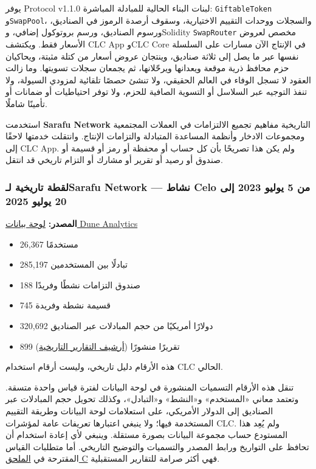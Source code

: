 \documentclass[11pt]{article}
\begin{document}
يوفر Protocol v1.1.0 لبنات البناء الحالية للمبادلة المباشرة: \texttt{GiftableToken} و\texttt{SwapPool}، والسجلات ووحدات التقييم الاختيارية، وسقوف أرصدة الرموز في الصناديق، ورسوم الصناديق، ورسم بروتوكول إضافي، وSolidity \texttt{SwapRouter} مخصص لعروض الأسعار فقط. ويكتشف CLC App وCLC Core في الإنتاج الآن مسارات على السلسلة نفسها عبر ما يصل إلى ثلاثة صناديق، وينتجان عروض أسعار من كتلة مثبتة، ويحاكيان حزم محافظ ذرية موقعة ويعدانها ويرحّلانها، ثم يجمعان سجلات تسويتها. وما زالت العقود لا تسجل الوفاء في العالم الحقيقي، ولا تنشئ حصصًا تلقائية لمزودي السيولة، ولا تنفذ التوجيه عبر السلاسل أو التسوية الصافية للحزم، ولا توفر احتياطيات أو ضمانات أو تأمينًا شاملًا.

استخدمت \textbf{Sarafu Network} التاريخية مفاهيم تجميع الالتزامات في العملات المجتمعية ومجموعات الادخار وأنظمة المساعدة المتبادلة والتزامات الإنتاج. وانتقلت خدمتها لاحقًا إلى CLC App. ولم يكن هذا تصريحًا بأن كل حساب أو محفظة أو رمز أو قسيمة أو صندوق أو رصيد أو تقرير أو مشارك أو التزام تاريخي قد انتقل.

\subsubsection*{لقطة تاريخية لـSarafu Network --- نشاط Celo من 5 يوليو 2023 إلى 20 يوليو 2025}

\textbf{المصدر:} \href{https://dune.com/grassrootseconomics/sarafu-network}{لوحة بيانات Dune Analytics}

\begin{itemize}[leftmargin=*]
\item 26,367 مستخدمًا
\item 285,197 تبادلًا بين المستخدمين
\item 188 صندوق التزامات نشطًا وفريدًا
\item 745 قسيمة نشطة وفريدة
\item 320,692 دولارًا أمريكيًا من حجم المبادلات عبر الصناديق
\item 899 تقريرًا منشورًا (\href{https://sarafu.network/reports}{أرشيف التقارير التاريخية})
\end{itemize}
هذه الأرقام دليل تاريخي، وليست أرقام استخدام CLC الحالي.

تنقل هذه الأرقام التسميات المنشورة في لوحة البيانات لفترة قياس واحدة متسقة. وتعتمد معاني «المستخدم» و«النشط» و«التبادل»، وكذلك تحويل حجم المبادلات عبر الصناديق إلى الدولار الأمريكي، على استعلامات لوحة البيانات وطريقة التقييم المستخدمة فيها؛ ولا ينبغي اعتبارها تعريفات عامة لمؤشرات CLC. ولم يُعِد هذا المستودع حساب مجموعة البيانات بصورة مستقلة. وينبغي لأي إعادة استخدام أن تحافظ على التواريخ ورابط المصدر والتسميات والتوضيح التاريخي. أما متطلبات القياس المقترحة في \href{https://docs.cosmolocal.credit/ar/white-paper/appendix-c-kpi-definitions}{الملحق C} فهي أكثر صرامة للتقارير المستقبلية.
\end{document}
